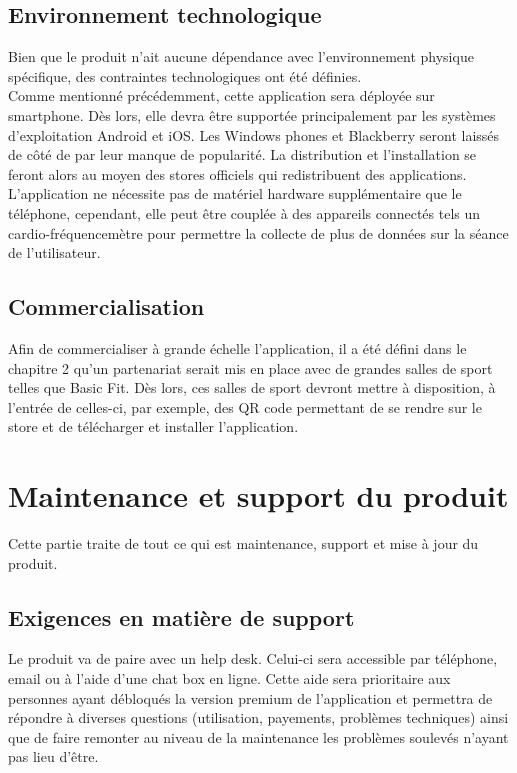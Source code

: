 \subsection*{Environnement technologique}
Bien que le produit n'ait aucune dépendance avec l'environnement physique spécifique, des contraintes technologiques ont été définies.\\

Comme mentionné précédemment, cette application sera déployée sur smartphone. Dès lors, elle devra être supportée principalement par les systèmes d'exploitation Android et iOS. Les Windows phones et Blackberry seront laissés de côté de par leur manque de popularité. La distribution et l'installation se feront alors au moyen des stores officiels qui redistribuent des applications.\\

L'application ne nécessite pas de matériel hardware supplémentaire que le téléphone, cependant, elle peut être couplée à des appareils connectés tels un cardio-fréquencemètre pour permettre la collecte de plus de données sur la séance de l'utilisateur.

\subsection*{Commercialisation}
Afin de commercialiser à grande échelle l'application, il a été défini dans le chapitre 2 qu'un partenariat serait mis en place avec de grandes salles de sport telles que Basic Fit. Dès lors, ces salles de sport devront mettre à disposition, à l'entrée de celles-ci, par exemple, des QR code permettant de se rendre sur le store et de télécharger et installer l'application.

\section{Maintenance et support du produit}
Cette partie traite de tout ce qui est maintenance, support et mise à jour du produit.

\subsection*{Exigences en matière de support}
Le produit va de paire avec un help desk. Celui-ci sera accessible par téléphone, email ou à l'aide d'une chat box en ligne. Cette aide sera prioritaire aux personnes ayant débloqués la version premium de l'application et permettra de répondre à diverses questions (utilisation, payements, problèmes techniques) ainsi que de faire remonter au niveau de la maintenance les problèmes soulevés n'ayant pas lieu d'être.

